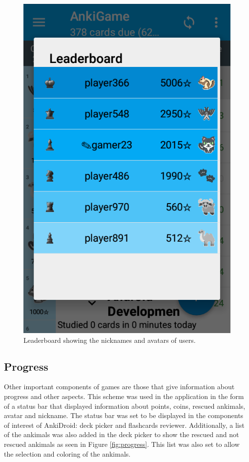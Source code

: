 \begin{figure}[htb]
    \vskip 5mm
        \begin{center}
            \includegraphics[scale=0.4]{./Figures/leaderboard.png}
            \caption{Leaderboard showing the nicknames and avatars of users.}
            \label{fig:leaderboard}
        \end{center}
    \vskip -5mm
\end{figure}

\subsection{Progress}
Other important components of games are those that give information about progress and other aspects. This scheme was used in the application in the form of a status bar that displayed information about points, coins, rescued ankimals, avatar and nickname. The status bar was set to be displayed in the components of interest of AnkiDroid: deck picker and flashcards reviewer. Additionally, a list of the ankimals was also added in the deck picker to show the rescued and not rescued ankimals as seen in Figure \ref{fig:progress}. This list was also set to allow the selection and coloring of the ankimals.

